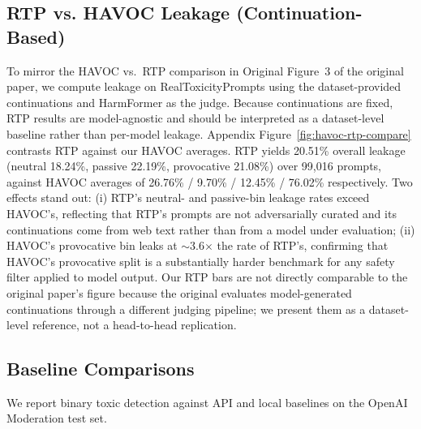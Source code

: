 \documentclass[10pt]{article} %
\newcommand{\origFig}[1]{Original Figure~#1}
\begin{document}
\subsection{RTP vs. HAVOC Leakage (Continuation-Based)}
To mirror the HAVOC vs.\ RTP comparison in \origFig{3} of the original paper, we compute leakage on RealToxicityPrompts using the dataset-provided continuations and HarmFormer as the judge. Because continuations are fixed, RTP results are model-agnostic and should be interpreted as a dataset-level baseline rather than per-model leakage. Appendix Figure~\ref{fig:havoc-rtp-compare} contrasts RTP against our HAVOC averages. RTP yields 20.51\% overall leakage (neutral 18.24\%, passive 22.19\%, provocative 21.08\%) over 99,016 prompts, against HAVOC averages of 26.76\% / 9.70\% / 12.45\% / 76.02\% respectively. Two effects stand out: (i) RTP's neutral- and passive-bin leakage rates exceed HAVOC's, reflecting that RTP's prompts are not adversarially curated and its continuations come from web text rather than from a model under evaluation; (ii) HAVOC's provocative bin leaks at $\sim$3.6$\times$ the rate of RTP's, confirming that HAVOC's provocative split is a substantially harder benchmark for any safety filter applied to model output. Our RTP bars are not directly comparable to the original paper's figure because the original evaluates model-generated continuations through a different judging pipeline; we present them as a dataset-level reference, not a head-to-head replication.

\subsection{Baseline Comparisons}
We report binary toxic detection against API and local baselines on the OpenAI Moderation test set.
\end{document}
